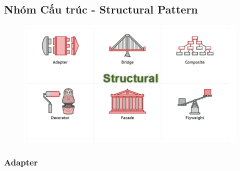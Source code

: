 \documentclass{article}
\begin{document}
    \begin{center}
        \hspace{0pt}
        \vfill
        \fontsize{30}{20}\selectfont\part{Nhóm Cấu trúc - Structural Pattern}
        \begin{figure}[htp]
            \begin{center}
                \includegraphics[scale=0.65]{./image/structural-pattern.png}
            \end{center}
        \end{figure}        
        \vfill
        \hspace{0pt}
    \end{center}
    \pagebreak

    \section{Adapter}
\end{document}
